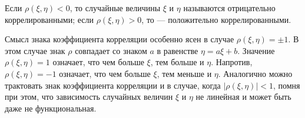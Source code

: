 \begin{definition}
	Если $\rho(\xi, \eta) < 0$, то случайные величины $\xi$ и $\eta$
называются отрицательно коррелированными; если $\rho(\xi, \eta) > 0$, то — положительно коррелированными.
\end{definition}
\begin{remark}\label{rem:19.12}
Смысл знака коэффициента корреляции особенно ясен
в случае $\rho(\xi, \eta) = \pm 1$. В этом случае знак $\rho$ совпадает со знаком $a$ в равенстве $\eta = a\xi + b$. Значение $\rho(\xi, \eta) = 1$ означает, что чем больше $\xi$, тем больше и $\eta$. Напротив, $\rho(\xi, \eta) = −1$ означает, что чем больше $\xi$, тем меньше и $\eta$. Аналогично можно трактовать знак коэффициента корреляции и
в случае, когда $|\rho(\xi, \eta)| < 1$, помня при этом, что зависимость случайных
величин $\xi$ и $\eta$ не линейная и может быть даже не функциональная.
\end{remark}
